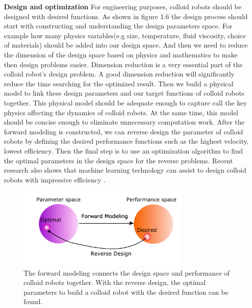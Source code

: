 \textbf{Design and optimization} For engineering purposes, colloid robots should be designed with desired functions.\cite{liebchen2019optimal} As shown in figure 1.6 the design process should start with constructing and understanding the design parameters space. For example how many physics variables(e.g size, temperature, fluid viscosity, choice of materials) should be added into our design space. And then we  need to reduce the dimension of the design space based on physics and mathematics to make then design problems easier. Dimension reduction is a very essential part of the colloid robot's design problem. A good dimension reduction will significantly reduce the time searching for the optimized result. Then we build a physical model to link these design parameters and our target functions of colloid robots together. This physical model should be adequate enough  to capture call the key physics affecting the dynamics of colloid robots. At the same time, this model should be concise enough to eliminate unnecessary computation work. After the forward modeling is constructed, we can reverse design the parameter of colloid robots by defining the desired performance functions such as the highest velocity, lowest efficiency. Then the final step is to use an optimization algorithm to find the optimal parameters in the design space for the reverse problems. \cite{ward1963hierarchical,nocedal2006numerical} Recent research also shows that machine learning technology can assist to design colloid robots with impressive efficiency .\cite{yang2020micro,yang2020cargo,yang2019deep,tsang2018self}
\begin{figure}
\centering
\includegraphics[width=8.5cm]{figures/1_6.pdf}
\caption{The forward modeling connects the design space and performance of colloid robots together. With the reverse design, the optimal parameters to build a colloid robot with the desired function can be found.}
\label{fig:1.6}
\end{figure}


